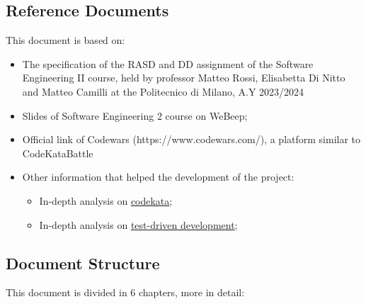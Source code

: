 \subsection{Reference Documents}

This document is based on: 
\begin{itemize}
    \item The specification of the RASD and DD assignment of the Software Engineering II course, held by professor Matteo Rossi, Elisabetta Di Nitto and Matteo Camilli at the Politecnico di Milano, A.Y 2023/2024
    \item Slides of Software Engineering 2 course on WeBeep;
    \item Official link of Codewars (https://www.codewars.com/), a platform similar to CodeKataBattle
    \item Other information that helped the development of the project: 
    \begin{itemize}
        \item In-depth analysis on \href{http://codekata.com/}{codekata};
        \item In-depth analysis on \href{https://en.wikipedia.org/wiki/Test-driven\textunderscore development}{test-driven development};
    \end{itemize}
\end{itemize}

\vspace{24pt}

\subsection{Document Structure}

This document is divided in 6 chapters, more in detail:

